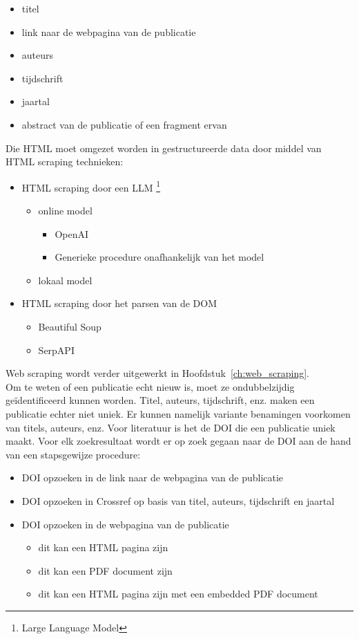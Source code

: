 \begin{itemize}
    \item titel
    \item link naar de webpagina van de publicatie
    \item auteurs
    \item tijdschrift
    \item jaartal
    \item abstract van de publicatie of een fragment ervan
\end{itemize}
Die HTML moet omgezet worden in gestructureerde data door middel van HTML scraping technieken:
\begin{itemize}
    \item HTML scraping door een LLM \footnote{Large Language Model}
    \begin{itemize}
        \item online model
        \begin{itemize}
            \item OpenAI
            \item Generieke procedure onafhankelijk van het model
        \end{itemize}
        \item lokaal model
    \end{itemize}
    \item HTML scraping door het parsen van de DOM
    \begin{itemize}
        \item Beautiful Soup
        \item SerpAPI
    \end{itemize}
\end{itemize}
Web scraping wordt verder uitgewerkt in Hoofdstuk~\ref{ch:web_scraping}.\\
Om te weten of een publicatie echt nieuw is, moet ze ondubbelzijdig geïdentificeerd kunnen worden. Titel, auteurs, tijdschrift, enz. maken een publicatie echter niet uniek. Er kunnen namelijk variante benamingen voorkomen van titels, auteurs, enz. Voor literatuur is het de DOI die een publicatie uniek maakt. Voor elk zoekresultaat wordt er op zoek gegaan naar de DOI aan de hand van een stapsgewijze procedure:
\begin{itemize}
    \item DOI opzoeken in de link naar de webpagina van de publicatie
    \item DOI opzoeken in Crossref op basis van titel, auteurs, tijdschrift en jaartal
    \item DOI opzoeken in de webpagina van de publicatie
    \begin{itemize}
        \item dit kan een HTML pagina zijn
        \item dit kan een PDF document zijn
        \item dit kan een HTML pagina zijn met een embedded PDF document
    \end{itemize}
\end{itemize}
